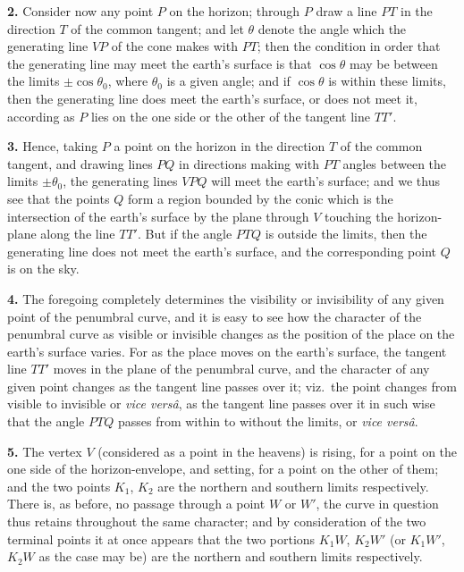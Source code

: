 \documentclass[11pt,a4paper]{book}
\begin{document}
\medskip
\noindent\textbf{2.}\quad
Consider now any point $P$ on the horizon; through $P$ draw a line $PT$ in the direction $T$ of the common tangent; and let $\theta$ denote the angle which the generating line $VP$ of the cone makes with $PT$; then the condition in order that the generating line may meet the earth's surface is that $\cos\theta$ may be between the limits $\pm\cos\theta_0$, where $\theta_0$ is a given angle; and if $\cos\theta$ is within these limits, then the generating line does meet the earth's surface, or does not meet it, according as $P$ lies on the one side or the other of the tangent line $TT'$.

\medskip
\noindent\textbf{3.}\quad
Hence, taking $P$ a point on the horizon in the direction $T$ of the common tangent, and drawing lines $PQ$ in directions making with $PT$ angles between the limits $\pm\theta_0$, the generating lines $VPQ$ will meet the earth's surface; and we thus see that the points $Q$ form a region bounded by the conic which is the intersection of the earth's surface by the plane through $V$ touching the horizon-plane along the line $TT'$. But if the angle $PTQ$ is outside the limits, then the generating line does not meet the earth's surface, and the corresponding point $Q$ is on the sky.

\medskip
\noindent\textbf{4.}\quad
The foregoing completely determines the visibility or invisibility of any given point of the penumbral curve, and it is easy to see how the character of the penumbral curve as visible or invisible changes as the position of the place on the earth's surface varies. For as the place moves on the earth's surface, the tangent line $TT'$ moves in the plane of the penumbral curve, and the character of any given point changes as the tangent line passes over it; viz.\ the point changes from visible to invisible or \textit{vice vers\^a}, as the tangent line passes over it in such wise that the angle $PTQ$ passes from within to without the limits, or \textit{vice vers\^a}.

\medskip
\noindent\textbf{5.}\quad
The vertex $V$ (considered as a point in the heavens) is rising, for a point on the one side of the horizon-envelope, and setting, for a point on the other of them; and the two points $K_1$, $K_2$ are the northern and southern limits respectively. There is, as before, no passage through a point $W$ or $W'$, the curve in question thus retains throughout the same character; and by consideration of the two terminal points it at once appears that the two portions $K_1W$, $K_2W'$ (or $K_1W'$, $K_2W$ as the case may be) are the northern and southern limits respectively.
\end{document}
